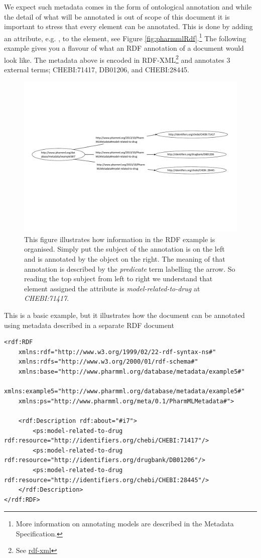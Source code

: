 We expect such metadata comes in the form of ontological annotation and
while the detail of what will be annotated is out of scope of this
document it is important to stress that every \pml element can be annotated. 
This is done by adding an attribute, e.g. , to the 
element, see Figure \ref{fig:pharmmlRdf}.\footnote{More information on 
annotating \pharmml models are described in the \pharmml Metadata Specification.} 
The following example gives you a flavour of what an RDF annotation of 
a \pharmml document would look like. 
The metadata above is encoded in RDF-XML\footnote{See \url{rdf-xml}}
and annotates 3 external terms; CHEBI:71417, DB01206, and CHEBI:28445.

\begin{figure}[htbp]
\centering
\includegraphics[width=0.95\linewidth]{pics/metadatadiagram.pdf}
\caption{This figure illustrates how information in the RDF example is
organised. Simply put the subject of the annotation is on the left and
is annotated by the object on the right. The meaning of that
annotation is described by the \emph{predicate} term labelling the
arrow. So reading the top subject from left to right we understand that
element assigned the attribute  is \emph{model-related-to-drug} at \emph{CHEBI:71417}.}
\label{fig:rdf-graph}
\end{figure}
This is a basic example, but it illustrates how the \pharmml document can be annotated 
using metadata described in a separate RDF document

%
\lstset{language=XML}
\begin{lstlisting}
<rdf:RDF
    xmlns:rdf="http://www.w3.org/1999/02/22-rdf-syntax-ns#"
    xmlns:rdfs="http://www.w3.org/2000/01/rdf-schema#"
    xmlns:base="http://www.pharmml.org/database/metadata/example5#"
    xmlns:example5="http://www.pharmml.org/database/metadata/example5#"
    xmlns:ps="http://www.pharmml.org/meta/0.1/PharmMLMetadata#"> 
    
    <rdf:Description rdf:about="#i7">
        <ps:model-related-to-drug rdf:resource="http://identifiers.org/chebi/CHEBI:71417"/>
        <ps:model-related-to-drug rdf:resource="http://identifiers.org/drugbank/DB01206"/>
        <ps:model-related-to-drug rdf:resource="http://identifiers.org/chebi/CHEBI:28445"/>
    </rdf:Description>
</rdf:RDF>
\end{lstlisting}

